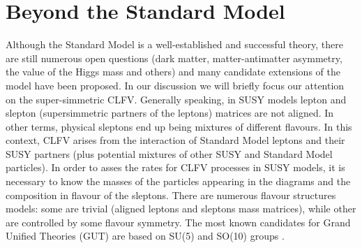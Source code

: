 \documentclass[12pt,a4paper,openright, oneside, titlepage]{book} %
\begin{document}
\section{Beyond the Standard Model}
Although the Standard Model is a well-established and successful theory, there are still numerous open questions (dark matter, matter-antimatter asymmetry, the value of the Higgs mass and others) and many candidate extensions of the model have been proposed.
In our discussion we will briefly focus our attention on the super-simmetric CLFV.
Generally speaking, in SUSY models lepton and slepton (supersimmetric partners of the leptons) matrices are not aligned. 
In other terms, physical sleptons end up being mixtures of different flavours. 
In this context, CLFV arises from the interaction of Standard Model leptons and their SUSY partners (plus potential mixtures of other SUSY and Standard Model particles). 
In order to asses the rates for CLFV processes in SUSY models, it is necessary to know the masses of the particles appearing in the diagrams and the composition in flavour of the sleptons.
There are numerous flavour structures models: some are trivial (aligned leptons and sleptons mass matrices), while other are controlled by some flavour symmetry. 
The most known candidates for Grand Unified Theories (GUT) are based on SU(5) and SO(10) groups \cite{Signorelli}.
\end{document}
